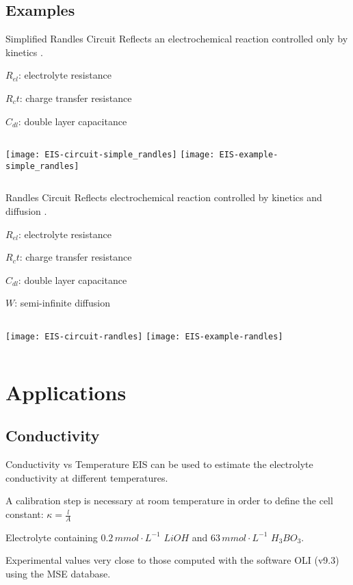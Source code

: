 \documentclass[10pt,compress,handout]{beamer}
\begin{document}
    \subsection{Examples}
    \begin{frame}{Simplified Randles Circuit}
        Reflects an electrochemical reaction controlled only by kinetics \citep{lazanas2023}.

        $R_{el}$: electrolyte resistance

        $R_ct$: charge transfer resistance

        $C_{dl}$: double layer capacitance

        \begin{columns}
                \texttt{[image: EIS-circuit-simple\_randles]}
                \texttt{[image: EIS-example-simple\_randles]}
        \end{columns}
    \end{frame}

    \begin{frame}{Randles Circuit}
        Reflects electrochemical reaction controlled by kinetics and diffusion \citep{lazanas2023}.

        $R_{el}$: electrolyte resistance

        $R_ct$: charge transfer resistance

        $C_{dl}$: double layer capacitance

        $W$: semi-infinite diffusion
        \begin{columns}
                \texttt{[image: EIS-circuit-randles]}
                \texttt{[image: EIS-example-randles]}
        \end{columns}
        
    \end{frame}

\section{Applications}
    \subsection{Conductivity}
    \begin{frame}{Conductivity vs Temperature}
        EIS can be used to estimate the electrolyte conductivity at different temperatures.

        A calibration step is necessary at room temperature in order 
        to define the cell constant: $\kappa = \frac{l}{A}$

        Electrolyte containing $0.2 \,mmol \cdot L^{-1}$ $LiOH$ and $63 \, mmol \cdot L^{-1}$ $H_3BO_3$.


        Experimental values very close to those computed with the software
        OLI (v9.3) using the MSE database.
    \end{frame}
\end{document}
